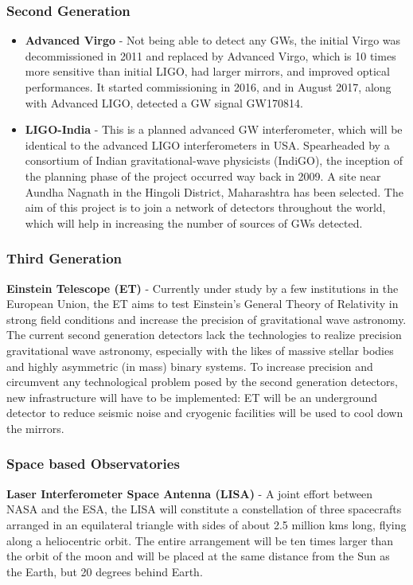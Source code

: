 \subsubsection{Second Generation}
\begin{itemize}
\item \textbf{Advanced Virgo} - Not being able to detect any GWs, the initial Virgo was decommissioned in 2011 and replaced by Advanced Virgo, which is 10 times more sensitive than initial LIGO, had larger mirrors, and improved optical performances. It started commissioning in 2016, and in August 2017, along with Advanced LIGO, detected a GW signal GW170814. \cite{Virgo}

\item \textbf{LIGO-India} -  This is a planned advanced GW interferometer, which will be identical to the advanced LIGO interferometers in USA. Spearheaded by a consortium of Indian gravitational-wave physicists (IndiGO), the inception of the planning phase of the project occurred way back in 2009. A site near Aundha Nagnath in the Hingoli District, Maharashtra has been selected. The aim of this project is to join a network of detectors throughout the world, which will help in increasing the number of sources of GWs detected. \cite{LIGO_India}
\end{itemize}

\subsubsection{Third Generation}
\textbf{Einstein Telescope (ET)} - Currently under study by a few institutions in the European Union, the ET aims to test Einstein's General Theory of Relativity in strong field conditions and increase the precision of gravitational wave astronomy. The current second generation detectors lack the technologies to realize precision gravitational wave astronomy, especially with the likes of massive stellar bodies and highly asymmetric (in mass) binary systems. To increase precision and circumvent any technological problem posed by the second generation detectors, new infrastructure will have to be implemented: ET will be an underground detector to reduce seismic noise and cryogenic facilities will be used to cool down the mirrors. \cite{ET}

\subsubsection{Space based Observatories}
\textbf{Laser Interferometer Space Antenna (LISA)} - A joint effort between NASA and the ESA, the LISA will constitute a constellation of three spacecrafts arranged in an equilateral triangle with sides of about 2.5 million kms long, flying along a heliocentric orbit. The entire arrangement will be ten times larger than the orbit of the moon and will be placed at the same distance from the Sun as the Earth, but 20 degrees behind Earth. \cite{LISA}
\pagebreak
